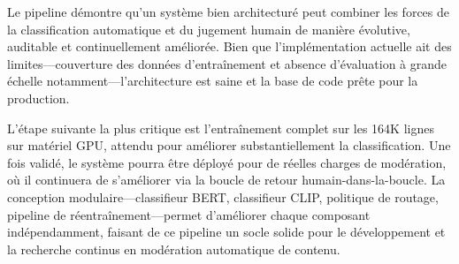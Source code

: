 Le pipeline démontre qu'un système bien architecturé peut combiner les forces de la classification automatique et du jugement humain de manière évolutive, auditable et continuellement améliorée. Bien que l'implémentation actuelle ait des limites---couverture des données d'entraînement et absence d'évaluation à grande échelle notamment---l'architecture est saine et la base de code prête pour la production.

L'étape suivante la plus critique est l'entraînement complet sur les 164K lignes sur matériel GPU, attendu pour améliorer substantiellement la classification. Une fois validé, le système pourra être déployé pour de réelles charges de modération, où il continuera de s'améliorer via la boucle de retour humain-dans-la-boucle. La conception modulaire---classifieur BERT, classifieur CLIP, politique de routage, pipeline de réentraînement---permet d'améliorer chaque composant indépendamment, faisant de ce pipeline un socle solide pour le développement et la recherche continus en modération automatique de contenu.
